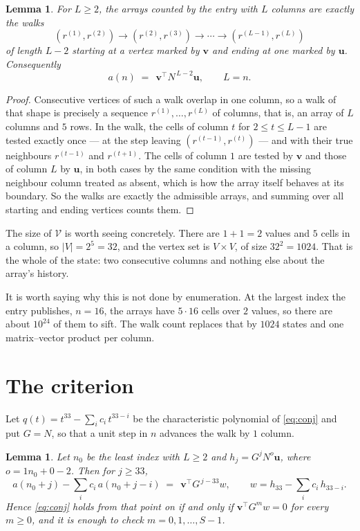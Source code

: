 \documentclass[11pt,a4paper]{article}
\theoremstyle{plain}
\newtheorem{lemma}[theorem]{Lemma}
\theoremstyle{definition}
\begin{document}
\begin{lemma}\label{lem:walk}
For $L\ge2$, the arrays counted by the entry with $L$ columns are exactly the walks
\[
(r^{(1)},r^{(2)})\to(r^{(2)},r^{(3)})\to\cdots\to(r^{(L-1)},r^{(L)})
\]
of length $L-2$ starting at a vertex marked by $\mathbf{v}$ and ending at one marked by
$\mathbf{u}$. Consequently
\[
a(n)\;=\;\,\mathbf{v}^{\!\top}N^{\,L-2}\mathbf{u},\qquad L=n .
\]
\end{lemma}

\begin{proof}
Consecutive vertices of such a walk overlap in one column, so a walk of that shape is
precisely a sequence $r^{(1)},\dots,r^{(L)}$ of columns, that is, an array of $L$ columns
and $5$ rows. In the walk, the cells of column $t$ for $2\le t\le L-1$ are tested
exactly once --- at the step leaving $(r^{(t-1)},r^{(t)})$ --- and with their true
neighbours $r^{(t-1)}$ and $r^{(t+1)}$. The cells of column $1$ are tested by
$\mathbf{v}$ and those of column $L$ by $\mathbf{u}$, in both cases by the same condition
with the missing neighbour column treated as absent, which is how the array itself behaves at
its boundary. So the walks are exactly the admissible arrays, and summing over all starting
and ending vertices counts them.
\end{proof}


The size of $\mathcal V$ is worth seeing concretely. There are $1+1=2$ values
and $5$ cells in a column, so $|V|=2^{5}=32$, and the vertex set is
$V\times V$, of size $32^2=1024$. That is the whole of the state: two consecutive
columns and nothing else about the array's history.

It is worth saying why this is not done by enumeration. At the largest index the entry
publishes, $n=16$, the arrays have $5\cdot16$ cells over
$2$ values, so there are about $10^{24}$ of them to sift. The
walk count replaces that by $1024$ states and one matrix--vector product per column.
\section{The criterion}

Let $q(t)=t^{33}-\sum_i c_i\,t^{33-i}$ be the characteristic polynomial of
\eqref{eq:conj} and put $G=N$, so that a unit step in $n$ advances the walk by
$1$ column.

\begin{lemma}\label{lem:crit}
Let $n_0$ be the least index with $L\ge2$ and $h_j=G^{j}N^{o}\mathbf{u}$, where
$o=1n_0+0-2$. Then for $j\ge33$,
\[
a(n_0+j)-\sum_i c_i\,a(n_0+j-i)\;=\;\,\mathbf{v}^{\!\top}G^{\,j-33}w,
\qquad w=h_{33}-\sum_i c_i\,h_{33-i} .
\]
Hence \eqref{eq:conj} holds from that point on if and only if
$\mathbf{v}^{\!\top}G^{m}w=0$ for every $m\ge0$, and it is enough to check
$m=0,1,\dots,S-1$.
\end{lemma}
\end{document}
